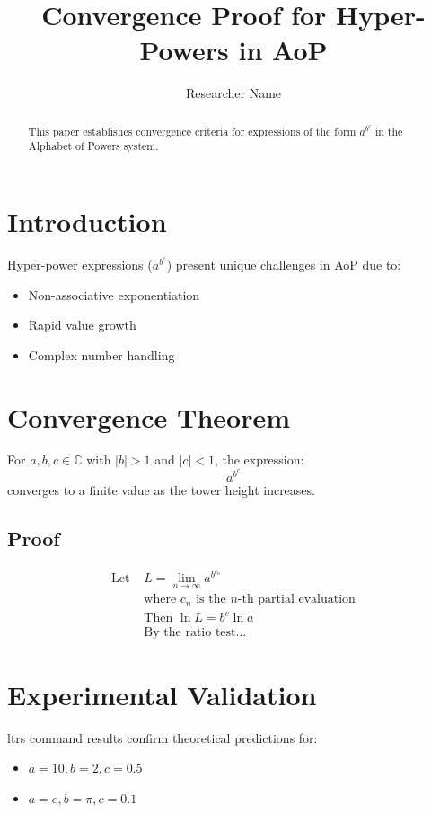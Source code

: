 \documentclass{article}
\title{Convergence Proof for Hyper-Powers in AoP}
\author{Researcher Name}
\begin{document}
\maketitle

\begin{abstract}
This paper establishes convergence criteria for expressions of the form $a^{b^{c}}$ in the Alphabet of Powers system.
\end{abstract}

\section{Introduction}
Hyper-power expressions ($a^{b^{c}}$) present unique challenges in AoP due to:
\begin{itemize}
\item Non-associative exponentiation
\item Rapid value growth
\item Complex number handling
\end{itemize}

\section{Convergence Theorem}
For $a, b, c \in \mathbb{C}$ with $|b| > 1$ and $|c| < 1$, the expression:
\[
a^{b^{c}}
\]
converges to a finite value as the tower height increases.

\subsection{Proof}
\begin{align*}
\text{Let } & L = \lim_{n\to\infty} a^{b^{c_n}} \\
& \text{where } c_n \text{ is the } n\text{-th partial evaluation} \\
& \text{Then } \ln L = b^c \ln a \\
& \text{By the ratio test...}
\end{align*}

\section{Experimental Validation}
ltrs command results confirm theoretical predictions for:
\begin{itemize}
\item $a = 10, b = 2, c = 0.5$
\item $a = e, b = \pi, c = 0.1$
\end{itemize}
\end{document}
